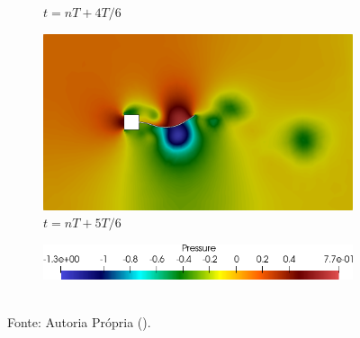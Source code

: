 \begin{figure}[h!]
\begin{subfigure}[b]{0.49\textwidth}
        \caption{$t=nT+4T/6$}
    \end{subfigure}
    \begin{subfigure}[b]{0.49\textwidth}
        \includegraphics[width=\linewidth]{Figuras/FSI-prism/pT6.png}
        \caption{$t=nT+5T/6$}
    \end{subfigure}
    \begin{subfigure}[b]{0.49\textwidth}
        \includegraphics[width=\linewidth]{Figuras/FSI-prism/legendap.png}
    \end{subfigure}
    \\Fonte: Autoria Própria (\the\year).
    \label{fig:prismPres}
\end{figure}

